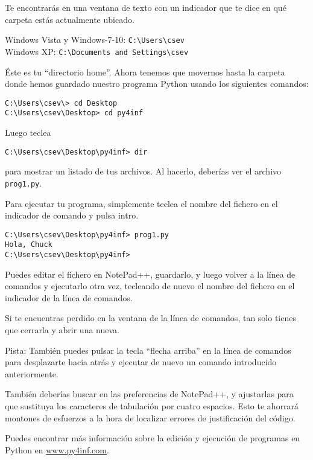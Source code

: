 Te encontrarás en una ventana de texto con un indicador que
te dice en qué carpeta estás actualmente ubicado.

Windows Vista y Windows-7-10: {\tt C:{\textbackslash}Users{\textbackslash}csev}\\
Windows XP: {\tt C:{\textbackslash}Documents and Settings{\textbackslash}csev}

Éste es tu ``directorio home''. Ahora tenemos que movernos hasta
la carpeta donde hemos guardado nuestro programa Python usando
los siguientes comandos:

\beforeverb
\begin{verbatim}
C:\Users\csev\> cd Desktop
C:\Users\csev\Desktop> cd py4inf
\end{verbatim}
\afterverb
%
Luego teclea

\beforeverb
\begin{verbatim}
C:\Users\csev\Desktop\py4inf> dir 
\end{verbatim}
\afterverb
%
para mostrar un listado de tus archivos. Al hacerlo, 
deberías ver el archivo {\tt prog1.py}.

Para ejecutar tu programa, simplemente teclea el nombre del fichero en
el indicador de comando y pulsa intro.

\beforeverb
\begin{verbatim}
C:\Users\csev\Desktop\py4inf> prog1.py
Hola, Chuck
C:\Users\csev\Desktop\py4inf> 
\end{verbatim}
\afterverb
%
Puedes editar el fichero en NotePad++, guardarlo, y luego volver
a la línea de comandos y ejecutarlo otra vez, tecleando de nuevo
el nombre del fichero en el indicador de la línea de comandos.

Si te encuentras perdido en la ventana de la línea de comandos, tan solo tienes
que cerrarla y abrir una nueva.

Pista: También puedes pulsar la tecla ``flecha arriba'' en la línea de comandos para
desplazarte hacia atrás y ejecutar de nuevo un comando introducido anteriormente.

También deberías buscar en las preferencias de NotePad++, y ajustarlas para
que sustituya los caracteres de tabulación por cuatro espacios. Esto te ahorrará
montones de esfuerzos a la hora de localizar errores de justificación del código.

Puedes encontrar más información sobre la edición y ejecución de
programas en Python en \url{www.py4inf.com}.

